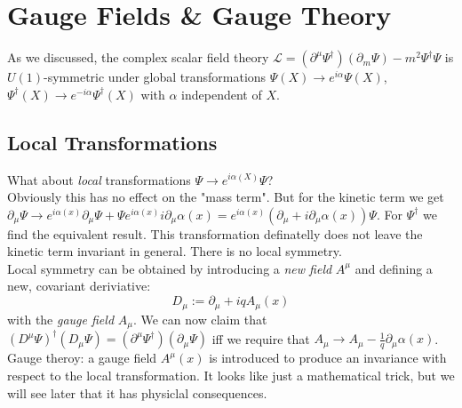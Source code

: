 \documentclass{report}
\begin{document}
\chapter{Gauge Fields \& Gauge Theory}
As we discussed, the complex scalar field theory $\mathcal{L} = \left( \partial^\mu \Psi^\dagger  \right) \left( \partial_m \Psi   \right) - m^2 \Psi^\dagger \Psi$ is $U(1)$-symmetric under global transformations $\Psi(X) \to e^{i\alpha} \Psi(X)$, $\Psi^\dagger(X) \to e^{-i\alpha} \Psi^\dagger(X)$ with $\alpha $ independent of $X$.\\
\section{Local Transformations}
What about \emph{local} transformations $\Psi \to e^{i\alpha(X)} \Psi$?\\
Obviously this has no effect on the "mass term". But for the kinetic term we get $\partial_\mu \Psi \to  e^{i\alpha(x)} \partial_\mu \Psi + \Psi e^{i\alpha(x)} i \partial_\mu \alpha(x) = e^{i\alpha(x)} \left( \partial_\mu + i \partial_\mu \alpha(x)   \right) \Psi $. For $\Psi^\dagger$ we find the equivalent result. This transformation definatelly does not leave the kinetic term invariant in general. There is no local symmetry.\\
Local symmetry can be obtained by introducing a \emph{new field} $A^\mu$ and defining a new, covariant deriviative:  \[
	D_\mu := \partial_\mu + iq A_\mu(x) 
\] with the \emph{gauge field} $A_\mu$. We can now claim that $(D^\mu \Psi)^\dagger \left( D_\mu \Psi \right) = (\partial^\mu \Psi^\dagger)\left( \partial_\mu \Psi  \right)$ iff we require that $A_\mu \to A_\mu - \frac{1}{q} \partial_\mu \alpha(x) $.\\
Gauge theroy: a gauge field $A^\mu(x)$ is introduced to produce an invariance with respect to the local transformation. It looks like just a mathematical trick, but we will see later that it has physiclal consequences.
\end{document}
